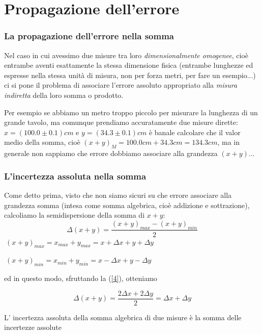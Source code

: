 \documentclass{beamer}
\theoremstyle{definition}
\theoremstyle{plain}
\begin{document}
\section{Propagazione dell'errore}

\begin{frame}
\frametitle{La propagazione dell'errore nella somma}
Nel caso in cui avessimo due misure tra loro \emph{dimensionalmente omogenee}, cioè entrambe aventi esattamente la stessa dimensione fisica (entrambe lunghezze ed espresse nella stessa unità di misura, non per forza metri, per fare un esempio...) ci si pone il problema di associare l'errore assoluto appropriato alla \emph{misura indiretta} della loro somma o prodotto.

Per esempio se abbiamo un metro troppo piccolo per misurare la lunghezza di un grande tavolo, ma comunque prendiamo accuratamente due misure dirette:
$x = (100.0 \pm 0.1) cm$ e $y = (34.3 \pm 0.1) cm$ è banale calcolare che il valor medio della somma, cioè
$(x + y)_M = 100.0cm + 34.3cm = 134.3 cm$, ma in generale non sappiamo che errore dobbiamo associare alla grandezza $(x+y)$...
\end{frame}

\begin{frame}
\frametitle{L'incertezza assoluta nella somma}
Come detto prima, visto che non siamo sicuri su che errore associare alla grandezza somma (intesa come somma algebrica, cioè addizione e sottrazione), calcoliamo la semidispersione della somma di $x + y$:
\begin{equation}
\Delta (x+y) = \frac{ (x+y)_{max} - (x+y)_{min} }{2}
\label{4}
\end{equation}
$\
(x+y)_{max} = x_{max} + y_{max} = x + \Delta x + y + \Delta y
\ $

$\
(x+y)_{min} = x_{min} + y_{min} = x - \Delta x + y - \Delta y
\ $

ed in questo modo, sfruttando la (\ref{4}), otteniamo

\begin{equation}
\Delta (x+y) = \frac{2 \Delta x + 2 \Delta y}{2} 
             = \Delta x + \Delta y 
\label{5} 
\end{equation}
\begin{theorem}
L' incertezza assoluta della somma algebrica di due misure è la somma delle incertezze assolute
\end{theorem}
\end{frame}
\end{document}
